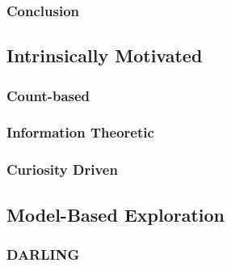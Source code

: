 \subsubsection{Conclusion}
\subsection{Intrinsically Motivated}
\subsubsection{Count-based}
\subsubsection{Information Theoretic}
\subsubsection{Curiosity Driven}
\subsection{Model-Based Exploration}
\subsubsection{DARLING}